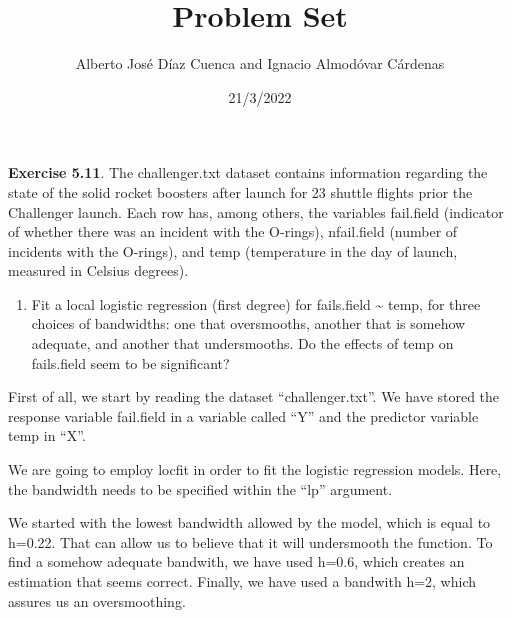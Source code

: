 \documentclass[
]{article}
\title{Problem Set}
\author{Alberto José Díaz Cuenca and Ignacio Almodóvar Cárdenas}
\date{21/3/2022}
\providecommand{\tightlist}{%
  \setlength{\itemsep}{0pt}\setlength{\parskip}{0pt}}
\begin{document}
\maketitle

\textbf{Exercise 5.11}. The challenger.txt dataset contains information
regarding the state of the solid rocket boosters after launch for 23
shuttle flights prior the Challenger launch. Each row has, among others,
the variables fail.field (indicator of whether there was an incident
with the O-rings), nfail.field (number of incidents with the O-rings),
and temp (temperature in the day of launch, measured in Celsius
degrees).

\begin{enumerate}
\def\labelenumi{\alph{enumi}.}
\tightlist
\item
  Fit a local logistic regression (first degree) for fails.field
  \textasciitilde{} temp, for three choices of bandwidths: one that
  oversmooths, another that is somehow adequate, and another that
  undersmooths. Do the effects of temp on fails.field seem to be
  significant?
\end{enumerate}

First of all, we start by reading the dataset ``challenger.txt''. We
have stored the response variable fail.field in a variable called ``Y''
and the predictor variable temp in ``X''.

We are going to employ locfit in order to fit the logistic regression
models. Here, the bandwidth needs to be specified within the ``lp''
argument.

We started with the lowest bandwidth allowed by the model, which is
equal to h=0.22. That can allow us to believe that it will undersmooth
the function. To find a somehow adequate bandwith, we have used h=0.6,
which creates an estimation that seems correct. Finally, we have used a
bandwith h=2, which assures us an oversmoothing.
\end{document}
